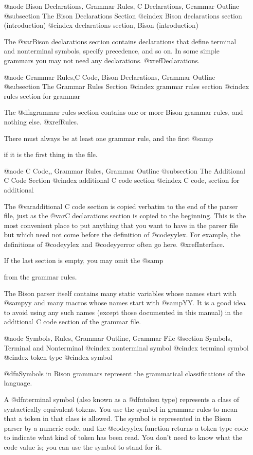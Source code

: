 {{{{{{{{{{{{{{{@node Bison Declarations, Grammar Rules, C Declarations, Grammar Outline
@subsection The Bison Declarations Section
@cindex Bison declarations section (introduction)
@cindex declarations section, Bison (introduction)

The @var{Bison declarations} section contains declarations that define
terminal and nonterminal symbols, specify precedence, and so on.
In some simple grammars you may not need any declarations.
@xref{Declarations}.

@node Grammar Rules,C Code, Bison Declarations, Grammar Outline
@subsection The Grammar Rules Section
@cindex grammar rules section
@cindex rules section for grammar

The @dfn{grammar rules} section contains one or more Bison grammar
rules, and nothing else.  @xref{Rules}.

There must always be at least one grammar rule, and the first
@samp{%
if it is the first thing in the file.

@node C Code,, Grammar Rules, Grammar Outline
@subsection The Additional C Code Section
@cindex additional C code section
@cindex C code, section for additional

The @var{additional C code} section is copied verbatim to the end of
the parser file, just as the @var{C declarations} section is copied to
the beginning.  This is the most convenient place to put anything
that you want to have in the parser file but which need not come before
the definition of @code{yylex}.  For example, the definitions of
@code{yylex} and @code{yyerror} often go here.  @xref{Interface}.

If the last section is empty, you may omit the @samp{%
from the grammar rules.

The Bison parser itself contains many static variables whose names start
with @samp{yy} and many macros whose names start with @samp{YY}.  It is a
good idea to avoid using any such names (except those documented in this
manual) in the additional C code section of the grammar file.

@node Symbols, Rules, Grammar Outline, Grammar File
@section Symbols, Terminal and Nonterminal
@cindex nonterminal symbol
@cindex terminal symbol
@cindex token type
@cindex symbol

@dfn{Symbols} in Bison grammars represent the grammatical classifications
of the language.

A @dfn{terminal symbol} (also known as a @dfn{token type}) represents a
class of syntactically equivalent tokens.  You use the symbol in grammar
rules to mean that a token in that class is allowed.  The symbol is
represented in the Bison parser by a numeric code, and the @code{yylex}
function returns a token type code to indicate what kind of token has been
read.  You don't need to know what the code value is; you can use the
symbol to stand for it.

}}}}}}}}}}}}}}}}}
